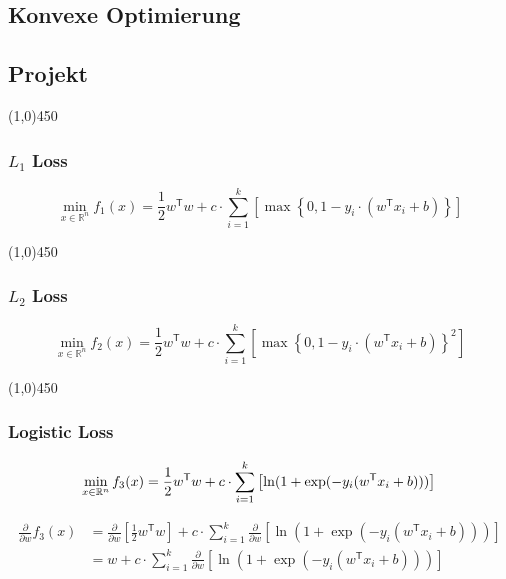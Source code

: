 \documentclass[12pt,landscape]{article}
\newcommand{\hr}{\begin{center} \line(1,0){450} \end{center}}
\newcommand{\tr}{^\mathsf{T}}
\begin{document}
\begin{center}
	\section*{Konvexe Optimierung}
	\subsection*{Projekt}
\end{center}
\hr
\subsubsection*{$L_1$ Loss}
\begin{equation}
\min\limits_{x \in \mathbb{R}^n} f_1(x) = \frac{1}{2} w\tr w +c \cdot \sum\limits_{i=1}^k \left[ \max \left\{ 0,1-y_i \cdot \left( w\tr x_i + b \right) \right\}\right]
\end{equation}
\hr
\subsubsection*{$L_2$ Loss}
\begin{equation}
\min\limits_{x \in \mathbb{R}^n} f_2(x) = \frac{1}{2} w\tr w +c \cdot \sum\limits_{i=1}^k \left[ \max \left\{ 0,1-y_i \cdot \left( w\tr x_i + b \right) \right\}^2\right]
\end{equation}
\hr
\subsubsection*{Logistic Loss}
\newcommand{\zLog}{1+\exp(-y_i (w\tr x_i + b))}


\begin{equation}
\min\limits_{x \in \mathbb{R}^n} f_3(x) = \frac{1}{2} w\tr w +c \cdot \sum\limits_{i=1}^k \left[ \ln(\zLog)\right]\\
\end{equation}

\begin{align*}
\frac{\partial}{\partial w} f_3(x) &= \frac{\partial}{\partial w} \left[ \frac{1}{2} w\tr w \right] +c \cdot \sum\limits_{i=1}^k \frac{\partial}{\partial w} \left[ \ln(\zLog)\right]\\
&= w +c \cdot \sum\limits_{i=1}^k \frac{\partial}{\partial w} \left[ \ln(\zLog)\right]\\
\end{align*}
\end{document}
